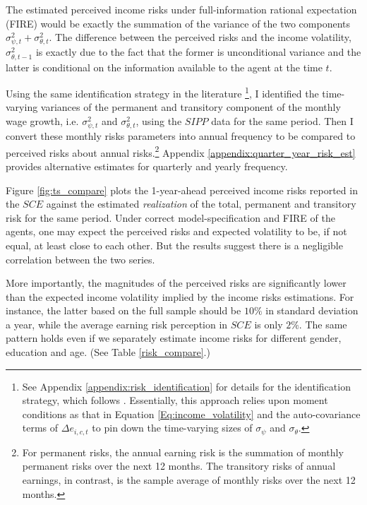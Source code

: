 The estimated perceived income risks under full-information rational expectation (FIRE) would be exactly the summation of the variance of the two components $\sigma^2_{\psi,t}+\sigma^2_{\theta,t}$. The difference between the perceived risks and the income volatility, $\sigma^2_{\theta,t-1}$ is exactly due to the fact that the former is unconditional variance and the latter is conditional on the information available to the agent at the time $t$. 

Using the same identification strategy in the literature \footnote{See Appendix \ref{appendix:risk_identification} for details for the identification strategy, which follows \cite{abowd1989covariance, carroll1997nature, meghir2004income, blundell_consumption_2008}. Essentially, this approach relies upon moment conditions as that in Equation \ref{Eq:income_volatility} and the auto-covariance terms of $\Delta e_{i,c,t}$ to pin down the time-varying sizes of $\sigma_{\psi}$ and $\sigma_{\theta}$.}, I identified the time-varying variances of the permanent and transitory component of the monthly wage growth, i.e. $\sigma^2_{\psi,t}$ and $\sigma^2_{\theta,t}$, using the $SIPP$ data for the same period. Then I convert these monthly risks parameters into annual frequency to be compared to perceived risks about annual risks.\footnote{For permanent risks, the annual earning risk is the summation of monthly permanent risks over the next 12 months. The transitory risks of annual earnings, in contrast, is the sample average of monthly risks over the next 12 months.} Appendix \ref{appendix:quarter_year_risk_est} provides alternative estimates for quarterly and yearly frequency. 


Figure \ref{fig:ts_compare} plots the 1-year-ahead perceived income risks reported in the $SCE$ against the estimated \emph{realization} of the total, permanent and transitory risk for the same period. Under correct model-specification and FIRE of the agents, one may expect the perceived risks and expected volatility to be, if not equal, at least close to each other. But the results suggest there is a negligible correlation between the two series. 

More importantly, the magnitudes of the perceived risks are significantly lower than the expected income volatility implied by the income risks estimations. For instance, the latter based on the full sample should be $10\%$ in standard deviation a year, while the average earning risk perception in $SCE$ is only $2\%$. The same pattern holds even if we separately estimate income risks for different gender, education and age. (See Table \ref{risk_compare}.)


